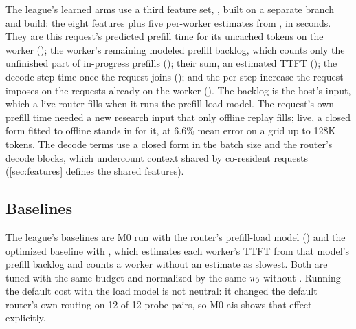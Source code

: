 The league's learned arms use a third feature set, , built on a separate branch and build:
the eight  features plus five per-worker estimates from \ais{}, in seconds. They are this
request's predicted prefill time for its uncached tokens on the worker ();
the worker's remaining modeled prefill backlog, which counts only the unfinished part of
in-progress prefills (); their sum, an estimated TTFT
(); the decode-step time once the request joins
(); and the per-step increase the request imposes on the requests
already on the worker (). The backlog is the host's
 input, which a live router fills when it runs the \ais{} prefill-load model.
The request's own prefill time needed a new research input that only offline replay fills; live, a
closed form fitted to \ais{} offline stands in for it, at 6.6\% mean error on a grid up to 128K
tokens. The decode terms use a closed form in the batch size and the router's decode blocks, which
undercount context shared by co-resident requests (\cref{sec:features} defines the shared features).

\subsection{Baselines}

The league's baselines are M0 run with the router's \ais{} prefill-load model
() and the optimized baseline with
, which estimates each worker's TTFT from that model's prefill backlog
and counts a worker without an estimate as slowest. Both are tuned with the same budget and
normalized by the same $\pi_{0}$ without \ais{}. Running the default cost with the \ais{} load model
is not neutral: it changed the default router's own routing on 12 of 12 probe pairs, so M0-ais
shows that effect explicitly.

